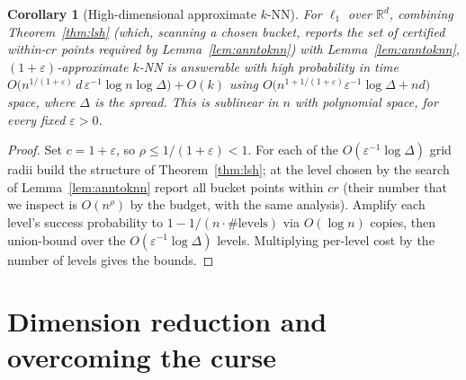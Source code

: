 \documentclass{amsart}
\newtheorem{corollary}{Corollary}
\newcommand{\R}{\mathbb{R}}
\newcommand{\eps}{\varepsilon}
\begin{document}
\begin{corollary}[High-dimensional approximate $k$-NN]\label{cor:knn}
For $\ell_1$ over $\R^d$, combining Theorem~\ref{thm:lsh} (which, scanning a chosen
bucket, reports the set of certified within-$cr$ points required by
Lemma~\ref{lem:anntoknn}) with Lemma~\ref{lem:anntoknn}, $(1+\eps)$-approximate $k$-NN
is answerable with high probability in time
$O\big(n^{1/(1+\eps)}\,d\,\eps^{-1}\log n\log\Delta\big)+O(k)$ using
$O\big(n^{1+1/(1+\eps)}\eps^{-1}\log\Delta + nd\big)$ space, where $\Delta$ is the
spread.  This is sublinear in $n$ with polynomial space, for every fixed $\eps>0$.
\end{corollary}
\begin{proof}
Set $c=1+\eps$, so $\rho\le 1/(1+\eps)<1$.  For each of the $O(\eps^{-1}\log\Delta)$
grid radii build the structure of Theorem~\ref{thm:lsh}; at the level chosen by the
search of Lemma~\ref{lem:anntoknn} report all bucket points within $cr$ (their number
that we inspect is $O(n^{\rho})$ by the budget, with the same analysis).  Amplify each
level's success probability to $1-1/(n\cdot \#\text{levels})$ via $O(\log n)$ copies,
then union-bound over the $O(\eps^{-1}\log\Delta)$ levels.  Multiplying per-level cost
by the number of levels gives the bounds.
\end{proof}

\section{Dimension reduction and overcoming the curse}
\end{document}
